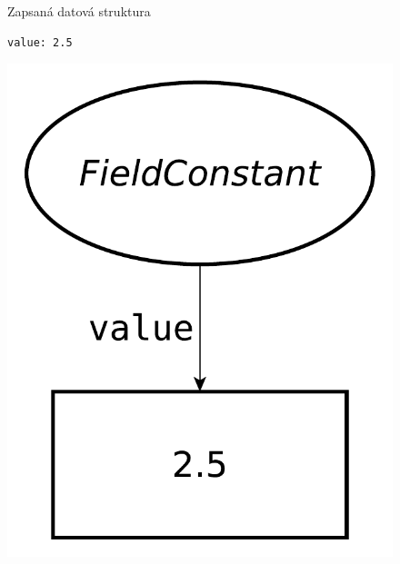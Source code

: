 \documentclass[FM,bw,DP]{tulthesis}
\begin{document}
\begin{figure}[ht]
\begin{minipage}[t]{0.45\linewidth}
\vspace{0pt}
Zapsaná datová struktura\\
\vspace{-5pt}
\begin{lstlisting}
value: 2.5

\end{lstlisting}
\vspace*{-20pt}
\begin{center}
\includegraphics[width=.5\textwidth]{../img/autoconversion_array_1_before.pdf}
\end{center}


\end{minipage}
\end{figure}
\end{document}
